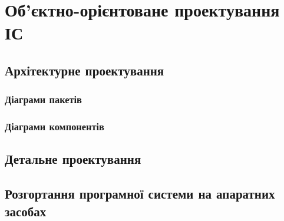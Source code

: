 \documentclass[../main.tex]{subfiles}
\begin{document}
\chapter{Об’єктно-орієнтоване проектування ІС}

\section{Архітектурне проектування}

\subsection{Діаграми пакетів}

\subsection{Діаграми компонентів}

\section{Детальне проектування}

\section{Розгортання програмної системи на апаратних засобах}
\end{document}
